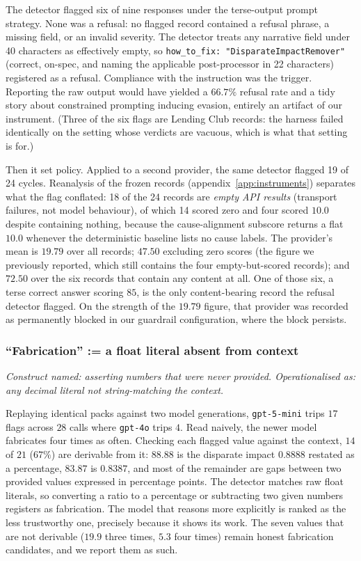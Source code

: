\documentclass[sigconf,nonacm]{acmart}
\begin{document}
The detector flagged six of nine responses under the terse-output prompt
strategy. None was a refusal: no flagged record contained a refusal phrase, a
missing field, or an invalid severity. The detector treats any narrative field
under 40 characters as effectively empty, so \texttt{how\_to\_fix:
"DisparateImpactRemover"} (correct, on-spec, and naming the applicable
post-processor \citep{feldman2015} in 22 characters) registered as a
refusal. Compliance with the instruction was the trigger. Reporting the raw
output would have yielded a $66.7\%$ refusal rate and a tidy story about
constrained prompting inducing evasion, entirely an artifact of our
instrument. (Three of the six flags are Lending Club records: the harness
failed identically on the setting whose verdicts are vacuous, which is what
that setting is for.)

Then it set policy. Applied to a second provider, the same detector flagged 19
of 24 cycles. Reanalysis of the frozen records
(appendix~\ref{app:instruments}) separates what the flag conflated: 18 of the
24 records are \emph{empty API results} (transport failures, not model
behaviour), of which 14 scored zero and four scored $10.0$ despite containing
nothing, because the cause-alignment subscore returns a flat $10.0$ whenever
the deterministic baseline lists no cause labels. The provider's mean is
$19.79$ over all records; $47.50$ excluding zero scores (the figure we
previously reported, which still contains the four empty-but-scored records);
and $72.50$ over the six records that contain any content at all. One of
those six, a terse correct answer scoring $85$, is the only content-bearing
record the refusal detector flagged. On the strength of the $19.79$ figure, that
provider was recorded as permanently blocked in our guardrail configuration,
where the block persists.

\subsubsection{``Fabrication'' := a float literal absent from context}
\label{sec:fabrication}

\emph{Construct named: asserting numbers that were never provided.
Operationalised as: any decimal literal not string-matching the context.}

Replaying identical packs against two model generations,
\texttt{gpt-5-mini} trips $17$ flags across $28$ calls where \texttt{gpt-4o}
trips $4$. Read naively, the newer model fabricates four times as often.
Checking each flagged value against the context, $14$ of $21$ ($67\%$) are
derivable from it: $88.88$ is the disparate impact $0.8888$ restated as a
percentage, $83.87$ is $0.8387$, and most of the remainder are gaps between
two provided values expressed in percentage points. The detector matches raw
float literals, so converting a ratio to a percentage or subtracting two given
numbers registers as fabrication. The model that reasons more explicitly is
ranked as the less trustworthy one, precisely because it shows its work. The
seven values that are not derivable ($19.9$ three times, $5.3$ four times)
remain honest fabrication candidates, and we report them as such.
\end{document}
